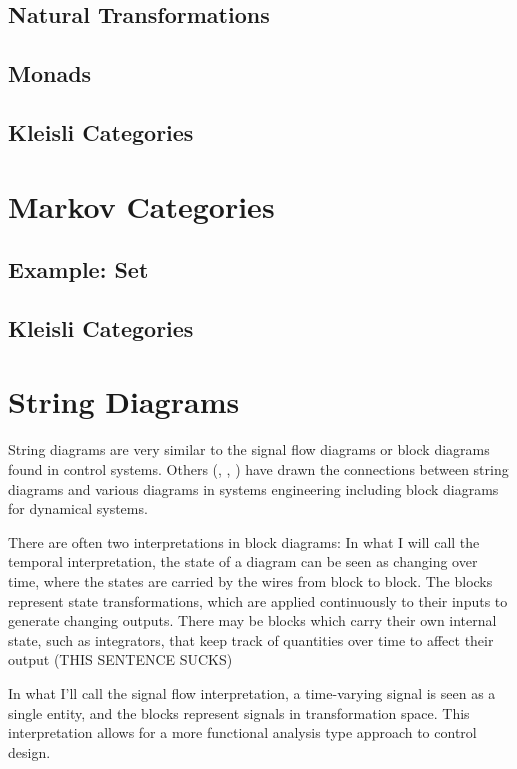 \subsection{Natural Transformations}
\subsection{Monads}
\subsection{Kleisli Categories}

\section{Markov Categories}

\newcommand{\id}{\mathrm{id}}
\newcommand{\comul}{\Delta}
\newcommand{\counit}{\delta}

\subsection{Example: Set}
\subsection{Kleisli Categories}

\section{String Diagrams}

String diagrams are very similar to the signal flow diagrams or block diagrams found in control systems.
Others (\cite{baez2015control}, \cite{fong2016thesis}, \cite{fong2016dynamicalsystems}) have drawn the connections between string diagrams and various diagrams in systems engineering including block diagrams for dynamical systems.

There are often two interpretations in block diagrams:
In what I will call the temporal interpretation, the state of a diagram can be seen as changing over time, where the states are carried by the wires from block to block. The blocks represent state transformations, which are applied continuously to their inputs to generate changing outputs.
There may be blocks which carry their own internal state, such as integrators, that keep track of quantities over time to affect their output (THIS SENTENCE SUCKS)

In what I'll call the signal flow interpretation, a time-varying signal is seen as a single entity, and the blocks represent signals in transformation space. This interpretation allows for a more functional analysis type approach to control design.

